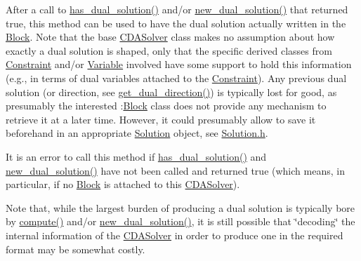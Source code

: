 After a call to \mbox{\hyperlink{class_s_m_spp__di__unipi__it_1_1_c_d_a_solver_a26970b0da7f4f7b56bcfc890983d9a40}{has\+\_\+dual\+\_\+solution()}} and/or \mbox{\hyperlink{class_s_m_spp__di__unipi__it_1_1_c_d_a_solver_a8c650415b6673c33692c363abdfdef00}{new\+\_\+dual\+\_\+solution()}} that returned true, this method can be used to have the dual solution actually written in the \mbox{\hyperlink{class_s_m_spp__di__unipi__it_1_1_block}{Block}}. Note that the base \mbox{\hyperlink{class_s_m_spp__di__unipi__it_1_1_c_d_a_solver}{C\+D\+A\+Solver}} class makes no assumption about how exactly a dual solution is shaped, only that the specific derived classes from \mbox{\hyperlink{class_s_m_spp__di__unipi__it_1_1_constraint}{Constraint}} and/or \mbox{\hyperlink{class_s_m_spp__di__unipi__it_1_1_variable}{Variable}} involved have some support to hold this information (e.\+g., in terms of dual variables attached to the \mbox{\hyperlink{class_s_m_spp__di__unipi__it_1_1_constraint}{Constraint}}). Any previous dual solution (or direction, see \mbox{\hyperlink{class_s_m_spp__di__unipi__it_1_1_c_d_a_solver_a145672680f07ca7eef090900b8d6ddcf}{get\+\_\+dual\+\_\+direction()}}) is typically lost for good, as presumably the interested \+:\mbox{\hyperlink{class_s_m_spp__di__unipi__it_1_1_block}{Block}} class does not provide any mechanism to retrieve it at a later time. However, it could presumably allow to save it beforehand in an appropriate \mbox{\hyperlink{class_s_m_spp__di__unipi__it_1_1_solution}{Solution}} object, see \mbox{\hyperlink{_solution_8h}{Solution.\+h}}.

It is an error to call this method if \mbox{\hyperlink{class_s_m_spp__di__unipi__it_1_1_c_d_a_solver_a26970b0da7f4f7b56bcfc890983d9a40}{has\+\_\+dual\+\_\+solution()}} and \mbox{\hyperlink{class_s_m_spp__di__unipi__it_1_1_c_d_a_solver_a8c650415b6673c33692c363abdfdef00}{new\+\_\+dual\+\_\+solution()}} have not been called and returned true (which means, in particular, if no \mbox{\hyperlink{class_s_m_spp__di__unipi__it_1_1_block}{Block}} is attached to this \mbox{\hyperlink{class_s_m_spp__di__unipi__it_1_1_c_d_a_solver}{C\+D\+A\+Solver}}).

Note that, while the largest burden of producing a dual solution is typically bore by \mbox{\hyperlink{class_s_m_spp__di__unipi__it_1_1_solver_a504d4e3e174c7a518cc66156a8a45ce5}{compute()}} and/or \mbox{\hyperlink{class_s_m_spp__di__unipi__it_1_1_c_d_a_solver_a8c650415b6673c33692c363abdfdef00}{new\+\_\+dual\+\_\+solution()}}, it is still possible that \char`\"{}decoding\char`\"{} the internal information of the \mbox{\hyperlink{class_s_m_spp__di__unipi__it_1_1_c_d_a_solver}{C\+D\+A\+Solver}} in order to produce one in the required format may be somewhat costly. \mbox{\label{class_s_m_spp__di__unipi__it_1_1_c_d_a_solver_a842fd454acaded84baf6b77e0d61a950}} 
